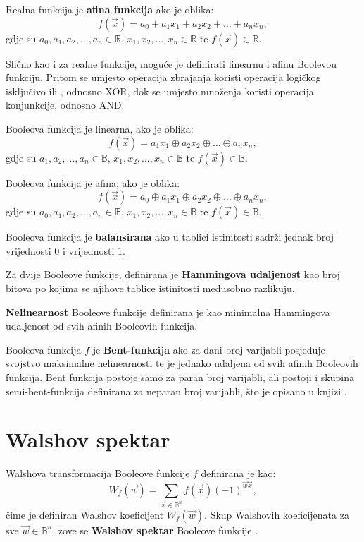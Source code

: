 Realna funkcija je \textbf{afina funkcija} ako je oblika:
\begin{equation}
    f(\vec{x}) = a_0 + a_1x_1 + a_2x_2 + \dots + a_nx_n,
\end{equation}
gdje su $a_0, a_1, a_2, \dots, a_n \in \mathds{R}$, $x_1, x_2, \dots, x_n \in \mathds{R}$ te $f(\vec{x}) \in \mathds{R}$.

Slično kao i za realne funkcije, moguće je definirati linearnu i afinu Boolevou funkciju.
Pritom se umjesto operacija zbrajanja koristi operacija logičkog isključivo ili , odnosno XOR, dok se umjesto množenja koristi operacija konjunkcije, odnosno AND.

Booleova funkcija je linearna, ako je oblika:
\begin{equation}
    f(\vec{x}) = a_1x_1 \oplus a_2x_2 \oplus \dots \oplus a_nx_n,
\end{equation}
gdje su $a_1, a_2, \dots, a_n \in \mathds{B}$, $x_1, x_2, \dots, x_n \in \mathds{B}$ te $f(\vec{x}) \in \mathds{B}$.

Booleova funkcija je afina, ako je oblika:
\begin{equation}
    f(\vec{x}) = a_0 \oplus a_1x_1 \oplus a_2x_2 \oplus \dots \oplus a_nx_n,
\end{equation}
gdje su $a_0, a_1, a_2, \dots, a_n \in \mathds{B}$, $x_1, x_2, \dots, x_n \in \mathds{B}$ te $f(\vec{x}) \in \mathds{B}$.

Booleova funkcija je \textbf{balansirana} ako u tablici istinitosti sadrži jednak broj vrijednosti $0$ i vrijednosti $1$.

Za dvije Booleove funkcije, definirana je \textbf{Hammingova udaljenost} kao broj bitova po kojima se njihove tablice istinitosti međusobno razlikuju.

\textbf{Nelinearnost} Booleove funkcije definirana je kao minimalna Hammingova udaljenost od svih afinih Booleovih funkcija.

Booleova funkcija $f$ je \textbf{Bent-funkcija} ako za dani broj varijabli posjeduje svojstvo maksimalne nelinearnosti te je jednako udaljena od svih afinih Booleovih funkcija.
Bent funkcija postoje samo za paran broj varijabli, ali postoji i skupina semi-bent-funkcija definirana za neparan broj varijabli, što je opisano u knjizi \cite{CryptographicBooleanFunctions}.

\section {Walshov spektar}
Walshova transformacija Booleove funkcije $f$ definirana je kao:
\begin{equation}\label{eq:walsh transform}
    W_f(\vec{w}) = \sum_{\vec{x} \in \mathds{B}^n}f(\vec{x})(-1)^{\vec{w}\vec{x}},
\end{equation}
čime je definiran Walshov koeficijent $W_f(\vec{w})$.
Skup Walshovih koeficijenata za sve $\vec{w} \in \mathds{B}^n$, zove se \textbf{Walshov spektar} Booleove funkcije \cite{CryptographicBooleanFunctions}.

